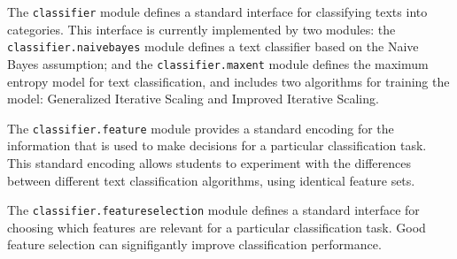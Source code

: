 \documentclass[11pt]{article}
\begin{document}
The \texttt{classifier} module defines a standard interface for
classifying texts into categories.  This interface is currently
implemented by two modules: the \texttt{classifier.naivebayes} module
defines a text classifier based on the Naive Bayes assumption; and the
\texttt{classifier.maxent} module defines the maximum entropy model
for text classification, and includes two algorithms for training the
model: Generalized Iterative Scaling and Improved Iterative Scaling.

The \texttt{classifier.feature} module provides a standard encoding
for the information that is used to make decisions for a particular
classification task.  This standard encoding allows students to
experiment with the differences between different text classification
algorithms, using identical feature sets.

The \texttt{classifier.featureselection} module defines a standard
interface for choosing which features are relevant for a particular
classification task.  Good feature selection can signifigantly improve
classification performance.
\end{document}
